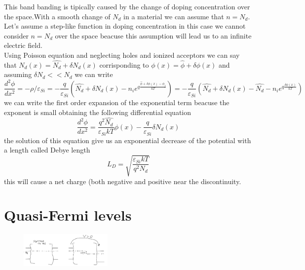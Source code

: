 This band banding is tipically caused by the change of doping concentration over the space.With a smooth change of $N_d$ in a material we can assume that $n=N_d$.\\
Let's assume a step-like function in doping concentration in this case we cannot consider $n=N_d$ over the space beacuse this assumption will lead us to an infinite electric field.\\ 
Using Poisson equation and neglecting holes and ionized acceptors we can say that $N_d(x)=\hat{N_d}+\delta N_d(x)$ corrisponding to $\phi(x)=\hat{\phi}+\delta \phi(x)$ and assuming $\delta N_d<<N_d $ we can write
\begin{equation}
\frac{d^2\phi}{dx^2}=-\rho/\varepsilon_{Si}=-\frac{q}{\varepsilon_{Si}}(\hat{N_d}+\delta N_d(x)-n_ie^{q\frac{\hat{\phi}+\delta\phi(x)-\phi_f}{kT}})=-\frac{q}{\varepsilon_{Si}}(\hat{N_d}+\delta N_d(x)-\hat{N_d}-n_ie^{q\frac{\delta\phi(x)}{kT}})
\end{equation}  
we can write the first order expansion of the exponential term beacuse the exponent is small obtaining the following differential equation
\begin{equation}
\frac{d^2\phi}{dx^2}=\frac{q^2\hat{N_d}}{\varepsilon_{Si}kT}\phi(x)-\frac{q}{\varepsilon_{Si}}\delta N_d(x)
\end{equation}
the solution of this equation give us an exponential decrease of the potential with a length called Debye length
\begin{equation}
L_D=\sqrt{\frac{\varepsilon_{Si}kT}{q^2N_d}}
\end{equation}
this will cause a net charge (both negative and positive near the discontinuity.\\
\section{Quasi-Fermi levels}

\begin{figure}
\includegraphics[width=0.4\textwidth]{perturbation.png}
\end{figure}

